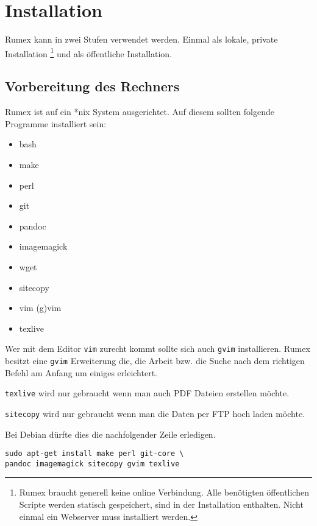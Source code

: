 \label{kap:installation}
\chapter{Installation}

Rumex kann in zwei Stufen verwendet werden.
Einmal als lokale, private Installation%
\footnote{ 
Rumex braucht generell keine online Verbindung.
Alle benötigten öffentlichen Scripte 
werden statisch gespeichert, sind in der Installation enthalten.
Nicht einmal ein Webserver muss installiert werden.}
und als öffentliche Installation.



\label{sec:vorbereitung-des-rechners}
\section{Vorbereitung des Rechners}

Rumex ist auf ein *nix System ausgerichtet. 
Auf diesem sollten folgende Programme installiert sein:

\begin{itemize}
\item bash
\item make
\item perl
\item git
\item pandoc
\item imagemagick
\item wget
\item sitecopy
\item vim (g)vim
\item texlive
\end{itemize}

Wer mit dem Editor \texttt{vim} zurecht kommt sollte sich auch
\texttt{gvim} installieren. 
Rumex besitzt eine \texttt{gvim} Erweiterung die, 
die Arbeit bzw. die Suche nach dem richtigen Befehl am
Anfang um einiges erleichtert.

\texttt{texlive} wird nur gebraucht wenn man auch PDF Dateien erstellen möchte.

\texttt{sitecopy} wird nur gebraucht wenn man die Daten per FTP hoch laden möchte.


Bei Debian dürfte dies die nachfolgender Zeile erledigen.
\begin{verbatim}
sudo apt-get install make perl git-core \
pandoc imagemagick sitecopy gvim texlive
\end{verbatim}





